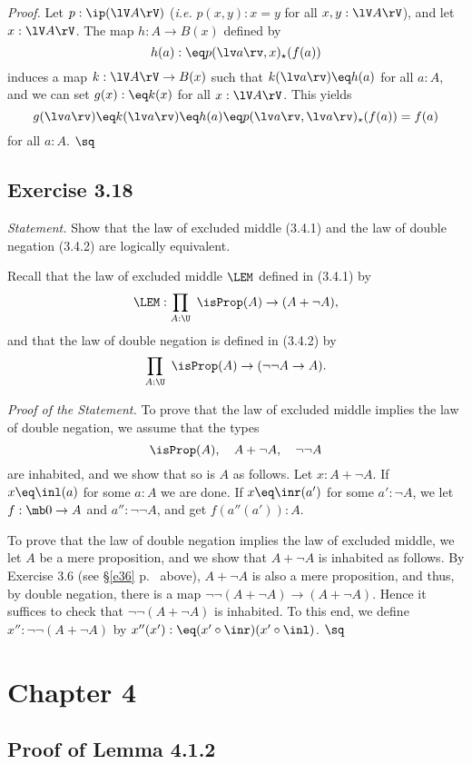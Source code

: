 \documentclass[12pt]{article}
\begin{document}
\nn\emph{Proof.} Let $p:\ip(\lV A\rV)$ (\emph{i.e.} $p(x,y):x=y$ for all $x,y:\lV A\rV$), and let $x:\lV A\rV$. The map $h:A\to B(x)$ defined by 
$$
h(a):\eq p(\lv a\rv,x)_\star(f(a))
$$ 
induces a map $k:\lV A\rV\to B(x)$ such that $k(\lv a\rv)\eq h(a)$ for all $a:A$, and we can set $g(x):\eq k(x)$ for all $x:\lV A\rV$. This yields 
$$
g(\lv a\rv)\eq k(\lv a\rv)\eq h(a)\eq p(\lv a\rv,\lv a\rv)_\star(f(a))=f(a)
$$ 
for all $a:A$. $\sq$


\subsection{Exercise 3.18}

\emph{Statement.} Show that the law of excluded middle (3.4.1) and the law of double negation (3.4.2) are logically equivalent.

Recall that the law of excluded middle $\LEM$ defined in (3.4.1) by 
$$
\LEM:\prod_{A:\U}\ \isProp(A)\to(A+\neg A),
$$ 
and that the law of double negation is defined in (3.4.2) by 
$$
\prod_{A:\U}\ \isProp(A)\to(\neg\neg A\to A).
$$ 

\nn\emph{Proof of the Statement.} To prove that the law of excluded middle implies the law of double negation, we assume that the types 
$$
\isProp(A),\quad A+\neg A,\quad \neg\neg A
$$ 
are inhabited, and we show that so is $A$ as follows. Let $x:A+\neg A$. If $x\eq\inl(a)$ for some $a:A$ we are done. If $x\eq\inr(a')$ for some $a':\neg A$, we let $f:\mb0\to A$ and $a'':\neg\neg A$, and get $f(a''(a')):A$. 

To prove that the law of double negation implies the law of excluded middle, we let $A$ be a mere proposition, and we show that $A+\neg A$ is inhabited as follows. By Exercise 3.6 (see \S\ref{e36} p.~\pageref{e36} above), $A+\neg A$ is also a mere proposition, and thus, by double negation, there is a map $\neg\neg(A+\neg A)\to(A+\neg A)$. Hence it suffices to check that $\neg\neg(A+\neg A)$ is inhabited. To this end, we define $x'':\neg\neg(A+\neg A)$ by $x''(x'):\eq(x'\circ\inr)(x'\circ\inl)$. $\sq$


\section{Chapter 4}

\subsection{Proof of Lemma 4.1.2}
\end{document}
